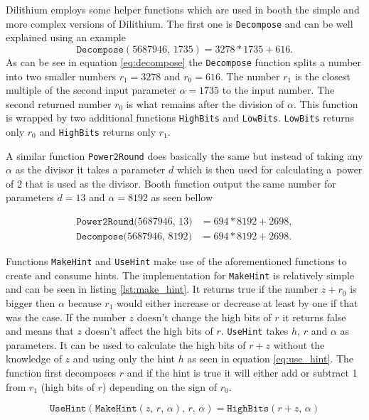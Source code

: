 Dilithium employs some helper functions which are used in booth the simple and more complex versions of Dilithium. The first one is \texttt{Decompose} and can be well explained using an example
\begin{equation}
  \label{eq:decompose}
  \mathrm{\texttt{Decompose}}(5687946,\,1735)=3278*1735+616.
\end{equation}
\noindent As can be see in equation \ref{eq:decompose} the \texttt{Decompose} function splits a number into two smaller numbers $r_1=3278$ and $r_0=616$. The number $r_1$ is the closest multiple of the second input parameter $\alpha=1735$ to the input number. The second returned number $r_0$ is what remains after the division of $\alpha$. This function is wrapped by two additional functions \texttt{HighBits} and \texttt{LowBits}. \texttt{LowBits} returns only $r_0$ and \texttt{HighBits} returns only $r_1$.

A similar function \texttt{Power2Round} does basically the same but instead of taking any $\alpha$ as the divisor it takes a parameter $d$ which is then used for calculating a~power of 2 that is used as the divisor. Booth function output the same number for parameters $d=13$ and $\alpha=8192$ as seen bellow

\begin{align}
  \mathrm{\texttt{Power2Round}}(5687946,\,13\mathrm)&=694*8192+2698, \\
  \mathrm{\texttt{Decompose}}(5687946,\,8192\mathrm)&=694*8192+2698.
\end{align}

Functions \texttt{MakeHint} and \texttt{UseHint} make use of the aforementioned functions to create and consume hints. The implementation for \texttt{MakeHint} is relatively simple and can be seen in listing \ref{lst:make_hint}. It returns true if the number $z+r_0$ is bigger then $\alpha$ because $r_1$ would either increase or decrease at least by one if that was the case. If the number $z$ doesn't change the high bits of $r$ it returns false and means that $z$ doesn't affect the high bits of $r$.
\noindent\texttt{UseHint} takes $h$, $r$ and $\alpha$ as parameters. It can be used to calculate the high bits of $r+z$ without the knowledge of $z$ and using only the hint $h$ as seen in equation \ref{eq:use_hint}. The function first decomposes $r$ and if the hint is true it will either add or subtract 1 from $r_1$ (high bits of $r$) depending on the sign of $r_0$.

\begin{equation}
  \label{eq:use_hint}
  \mathrm{\texttt{UseHint}}(\mathrm{\texttt{MakeHint}}(z,\,r,\,\alpha),\,r,\,\alpha)=\mathrm{\texttt{HighBits}}(r+z,\,\alpha)
\end{equation}
